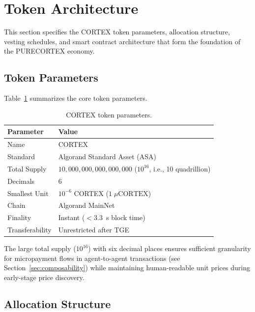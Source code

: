 \section{Token Architecture}
\label{sec:architecture}

This section specifies the CORTEX token parameters, allocation structure,
vesting schedules, and smart contract architecture that form the foundation of
the PURECORTEX economy.

\subsection{Token Parameters}
\label{subsec:token-params}

Table~\ref{tab:token-params} summarizes the core token parameters.

\begin{table}[H]
\centering
\caption{CORTEX token parameters.}
\label{tab:token-params}
\begin{tabular}{@{}ll@{}}
\toprule
\textbf{Parameter} & \textbf{Value} \\
\midrule
Name & CORTEX \\
Standard & Algorand Standard Asset (ASA) \\
Total Supply & $10{,}000{,}000{,}000{,}000{,}000$ ($10^{16}$, i.e., 10 quadrillion) \\
Decimals & 6 \\
Smallest Unit & $10^{-6}$ CORTEX ($1\;\mu\text{CORTEX}$) \\
Chain & Algorand MainNet \\
Finality & Instant ($< 3.3$~s block time) \\
Transferability & Unrestricted after TGE \\
\bottomrule
\end{tabular}
\end{table}

The large total supply ($10^{16}$) with six decimal places ensures sufficient
granularity for micropayment flows in agent-to-agent transactions (see
Section~\ref{sec:composability}) while maintaining human-readable unit prices
during early-stage price discovery.

\subsection{Allocation Structure}
\label{subsec:allocation}

